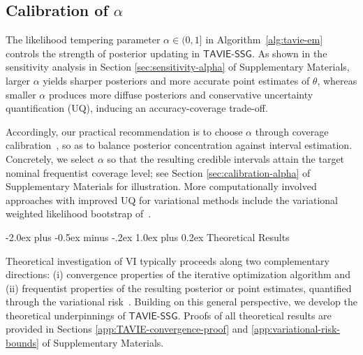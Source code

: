 \documentclass[12pt]{article}
\makeatletter
\def\section{\@startsection{section}{1}{\z@}
  {-2.0ex plus -0.5ex minus -.2ex} %
  {1.0ex plus 0.2ex}               %
  {\normalfont\Large\bfseries}}
\numberwithin{equation}{section}
\newcommand{\tssg}{\mathsf{TAVIE}\text{-}\mathsf{SSG}}
\makeatother
\begin{document}

\subsection{Calibration of \texorpdfstring{$\alpha$}{the tempering parameter}}\label{subsec:calibration-alpha}

The likelihood tempering parameter $\alpha\in(0,1]$ in Algorithm~\ref{alg:tavie-em} controls the strength of posterior updating in $\tssg$. As shown in the sensitivity analysis in Section \ref{sec:sensitivity-alpha} of Supplementary Materials, larger $\alpha$ yields sharper posteriors and more accurate point estimates of $\theta$, whereas smaller $\alpha$ produces more diffuse posteriors and conservative uncertainty quantification (UQ), inducing an accuracy-coverage trade-off.

Accordingly, our practical recommendation is to choose $\alpha$ through coverage calibration~\citep{SyringMartin2019}, so as to balance posterior concentration against interval estimation. Concretely, we select $\alpha$ so that the resulting credible intervals attain the target nominal frequentist coverage level; see Section \ref{sec:calibration-alpha} of Supplementary Materials for illustration. More computationally involved approaches with improved UQ for variational methods include the variational weighted likelihood bootstrap of~\cite{han2019statisticalinferencemeanfieldvariational}.


\section{Theoretical Results}\label{section:theory}

Theoretical investigation of VI typically proceeds along two complementary directions:
(i) convergence properties of the iterative optimization algorithm 
\citep{ZhangZhou2017, Pati-Annals-CAVI} and
(ii) frequentist properties of the resulting posterior or point estimates, quantified through the variational risk~\citep{Wang03072019,AlquierRidgway2020}. Building on this general perspective, we develop the theoretical underpinnings of $\tssg$. Proofs of all theoretical results are provided in Sections \ref{app:TAVIE-convergence-proof} and \ref{app:variational-risk-bounds} of Supplementary Materials.
\end{document}
